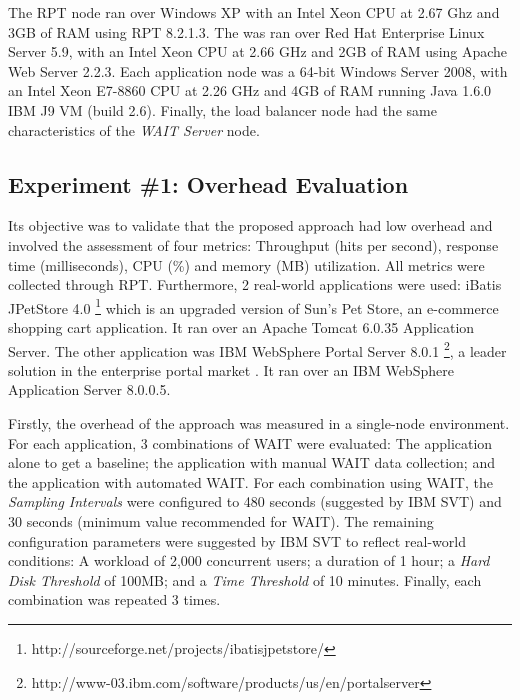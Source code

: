 \documentclass[runningheads,a4paper]{llncs}
\begin{document}
The RPT node ran over Windows XP with an Intel Xeon CPU at
2.67 Ghz and 3GB of RAM using RPT 8.2.1.3. The  was ran over
Red Hat Enterprise Linux Server 5.9, with an Intel Xeon CPU at 2.66 GHz and 2GB of
RAM using Apache Web Server 2.2.3. Each application node was a 64-bit Windows
Server 2008, with an Intel Xeon E7-8860 CPU at 2.26 GHz and 4GB of RAM
running Java 1.6.0 IBM J9 VM (build 2.6). Finally, the load balancer node had
the same characteristics of the \emph{WAIT Server} node. 

\vspace{-5pt}
\subsection{Experiment \#1: Overhead Evaluation}
\vspace{-2pt}
Its objective was to validate that the proposed approach had low overhead and
involved the assessment of four metrics: Throughput (hits per second), response
time (milliseconds), CPU (\%) and memory (MB) utilization. All metrics were
collected through RPT. Furthermore, 2 real-world applications were used: iBatis JPetStore
4.0 \footnote{http://sourceforge.net/projects/ibatisjpetstore/} which is an upgraded
version of Sun's Pet Store, an e-commerce shopping cart application. It ran over
an Apache Tomcat 6.0.35 Application Server. The other application was IBM
WebSphere Portal Server 8.0.1 \footnote{http://www-03.ibm.com/software/products/us/en/portalserver},
a leader solution in the enterprise portal market \cite{Gartner2008}. It ran
over an IBM WebSphere Application Server 8.0.0.5.

Firstly, the overhead of the approach was measured in a single-node environment.
For each application, 3 combinations of WAIT were evaluated: The application
alone to get a baseline; the application with manual WAIT data collection;
and the application with automated WAIT. For each combination using WAIT, the
\emph{Sampling Intervals} were configured to 480 seconds (suggested by IBM SVT)
and 30 seconds (minimum value recommended for WAIT). The remaining configuration
parameters were suggested by IBM SVT to reflect real-world conditions:
A workload of 2,000 concurrent users; a duration of 1 hour; a \emph{Hard Disk
Threshold} of 100MB; and a \emph{Time Threshold} of 10 minutes. Finally, each
combination was repeated 3 times.
\end{document}
